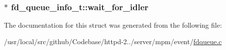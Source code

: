 \subsubsection[{\texorpdfstring{wait\+\_\+for\+\_\+idler}{wait_for_idler}}]{ $\ast$ fd\+\_\+queue\+\_\+info\+\_\+t\+::wait\+\_\+for\+\_\+idler}\hypertarget{structfd__queue__info__t_ab55cf55999e66ef49df240ec7ac1b750}{}\label{structfd__queue__info__t_ab55cf55999e66ef49df240ec7ac1b750}


The documentation for this struct was generated from the following file\+:\begin{DoxyCompactItemize}
\item 
/usr/local/src/github/\+Codebase/httpd-\/2../server/mpm/event/\hyperlink{event_2fdqueue_8c}{fdqueue.\+c}\end{DoxyCompactItemize}
